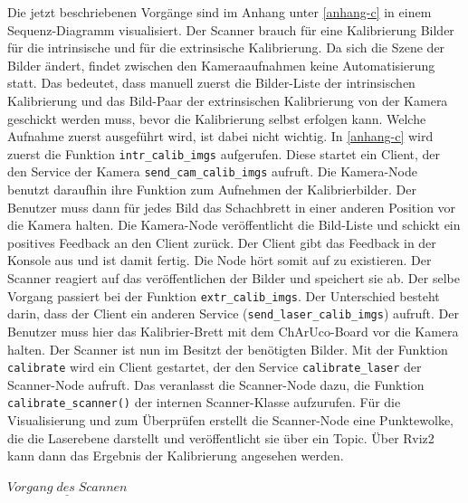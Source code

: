 		Die jetzt beschriebenen Vorgänge sind im Anhang unter \ref{anhang-c} in einem Sequenz-Diagramm visualisiert. \newline
		Der Scanner brauch für eine Kalibrierung Bilder für die intrinsische und für die extrinsische Kalibrierung. Da sich die Szene der Bilder ändert, findet zwischen den Kameraaufnahmen keine Automatisierung statt. Das bedeutet, dass manuell zuerst die Bilder-Liste der intrinsischen Kalibrierung und das Bild-Paar der extrinsischen Kalibrierung von der Kamera geschickt werden muss, bevor die Kalibrierung selbst erfolgen kann. Welche Aufnahme zuerst ausgeführt wird, ist dabei nicht wichtig. In \ref{anhang-c} wird zuerst die Funktion \verb|intr_calib_imgs| aufgerufen. Diese startet ein Client, der den Service der Kamera \verb|send_cam_calib_imgs| aufruft. Die Kamera-Node benutzt daraufhin ihre Funktion zum Aufnehmen der Kalibrierbilder. Der Benutzer muss dann für jedes Bild das Schachbrett in einer anderen Position vor die Kamera halten. Die Kamera-Node veröffentlicht die Bild-Liste und schickt ein positives Feedback an den Client zurück. Der Client gibt das Feedback in der Konsole aus und ist damit fertig. Die Node hört somit auf zu existieren. Der Scanner reagiert auf das veröffentlichen der Bilder und speichert sie ab. \newline
		Der selbe Vorgang passiert bei der Funktion \verb|extr_calib_imgs|. Der Unterschied besteht darin, dass der Client ein anderen Service (\verb|send_laser_calib_imgs|) aufruft. Der Benutzer muss hier das Kalibrier-Brett mit dem ChArUco-Board vor die Kamera halten. \newline
		Der Scanner ist nun im Besitzt der benötigten Bilder. Mit der Funktion \verb|calibrate| wird ein Client gestartet, der den Service \verb|calibrate_laser| der Scanner-Node aufruft. Das veranlasst die Scanner-Node dazu, die Funktion \verb|calibrate_scanner()| der internen Scanner-Klasse aufzurufen. Für die Visualisierung und zum Überprüfen erstellt die Scanner-Node eine Punktewolke, die die Laserebene darstellt und veröffentlicht sie über ein Topic. Über Rviz2 kann dann das Ergebnis der Kalibrierung angesehen werden.
		
		$\underline{Vorgang\;des\;Scannen}$
		
